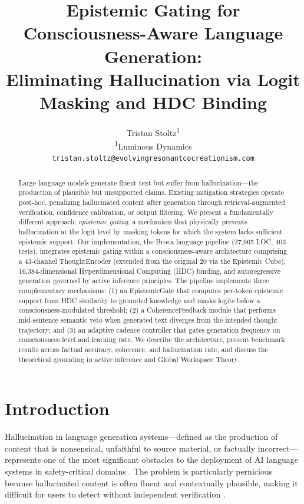 \documentclass[12pt,a4paper]{article}
\title{Epistemic Gating for Consciousness-Aware Language Generation:\\Eliminating Hallucination via Logit Masking and HDC Binding}
\author{
  Tristan Stoltz\textsuperscript{1} \\
  \textsuperscript{1}Luminous Dynamics \\
  \texttt{tristan.stoltz@evolvingresonantcocreationism.com}
}
\date{}
\begin{document}
\maketitle

\begin{abstract}
Large language models generate fluent text but suffer from hallucination---the production of plausible but unsupported claims. Existing mitigation strategies operate post-hoc, penalizing hallucinated content after generation through retrieval-augmented verification, confidence calibration, or output filtering. We present a fundamentally different approach: \emph{epistemic gating}, a mechanism that physically prevents hallucination at the logit level by masking tokens for which the system lacks sufficient epistemic support. Our implementation, the Broca language pipeline (27,965 LOC, 403 tests), integrates epistemic gating within a consciousness-aware architecture comprising a 43-channel ThoughtEncoder (extended from the original 20 via the Epistemic Cube), 16,384-dimensional Hyperdimensional Computing (HDC) binding, and autoregressive generation governed by active inference principles. The pipeline implements three complementary mechanisms: (1) an EpistemicGate that computes per-token epistemic support from HDC similarity to grounded knowledge and masks logits below a consciousness-modulated threshold; (2) a CoherenceFeedback module that performs mid-sentence semantic veto when generated text diverges from the intended thought trajectory; and (3) an adaptive cadence controller that gates generation frequency on consciousness level and learning rate. We describe the architecture, present benchmark results across factual accuracy, coherence, and hallucination rate, and discuss the theoretical grounding in active inference and Global Workspace Theory.
\end{abstract}

\section{Introduction}

Hallucination in language generation systems---defined as the production of content that is nonsensical, unfaithful to source material, or factually incorrect---represents one of the most significant obstacles to the deployment of AI language systems in safety-critical domains \citep{ji2023survey, maynez2020faithfulness}. The problem is particularly pernicious because hallucinated content is often fluent and contextually plausible, making it difficult for users to detect without independent verification \citep{lin2022truthfulqa}.
\end{document}
